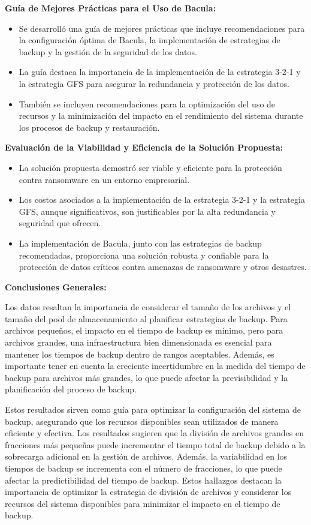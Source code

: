 \textbf{Guía de Mejores Prácticas para el Uso de Bacula:}
\begin{itemize}
    \item Se desarrolló una guía de mejores prácticas que incluye recomendaciones para la configuración óptima de Bacula, la implementación de estrategias de backup y la gestión de la seguridad de los datos.
    \item La guía destaca la importancia de la implementación de la estrategia 3-2-1 y la estrategia GFS para asegurar la redundancia y protección de los datos.
    \item También se incluyen recomendaciones para la optimización del uso de recursos y la minimización del impacto en el rendimiento del sistema durante los procesos de backup y restauración.
\end{itemize}

\textbf{Evaluación de la Viabilidad y Eficiencia de la Solución Propuesta:}
\begin{itemize}
    \item La solución propuesta demostró ser viable y eficiente para la protección contra ransomware en un entorno empresarial.
    \item Los costos asociados a la implementación de la estrategia 3-2-1 y la estrategia GFS, aunque significativos, son justificables por la alta redundancia y seguridad que ofrecen.
    \item La implementación de Bacula, junto con las estrategias de backup recomendadas, proporciona una solución robusta y confiable para la protección de datos críticos contra amenazas de ransomware y otros desastres.
\end{itemize}

\textbf{Conclusiones Generales:}

Los datos resaltan la importancia de considerar el tamaño de los archivos y el tamaño del pool de almacenamiento al planificar estrategias de backup. Para archivos pequeños, el impacto en el tiempo de backup es mínimo, pero para archivos grandes, una infraestructura bien dimensionada es esencial para mantener los tiempos de backup dentro de rangos aceptables. Además, es importante tener en cuenta la creciente incertidumbre en la medida del tiempo de backup para archivos más grandes, lo que puede afectar la previsibilidad y la planificación del proceso de backup.

Estos resultados sirven como guía para optimizar la configuración del sistema de backup, asegurando que los recursos disponibles sean utilizados de manera eficiente y efectiva. Los resultados sugieren que la división de archivos grandes en fracciones más pequeñas puede incrementar el tiempo total de backup debido a la sobrecarga adicional en la gestión de archivos. Además, la variabilidad en los tiempos de backup se incrementa con el número de fracciones, lo que puede afectar la predictibilidad del tiempo de backup. Estos hallazgos destacan la importancia de optimizar la estrategia de división de archivos y considerar los recursos del sistema disponibles para minimizar el impacto en el tiempo de backup.

